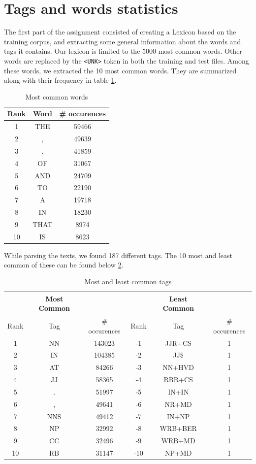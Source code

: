 \documentclass[10pt, a4paper, oneside]{article} %
\begin{document}
\section{Tags and words statistics}
The first part of the assignment consisted of creating a Lexicon based on the training corpus, and extracting some general information about the words and tags it contains. Our lexicon is limited to the 5000 most common words. Other words are replaced by the \texttt{<UNK>} token in both the training and test files. Among these words, we extracted the 10 most common words. They are summarized along with their frequency in table \ref{words}.
\begin{table}[!h]
\centering
\begin{tabular}{ | c | c | c | }
\hline
Rank & Word & \# occurences \\ \hline
1 & THE & 59466 \\
2 & , & 49639 \\
3 & . & 41859 \\
4 & OF & 31067 \\
5 & AND & 24709 \\
6 & TO & 22190 \\
7 & A & 19718 \\
8 & IN & 18230 \\
9 & THAT & 8974 \\
10 & IS &8623 \\ \hline
\end{tabular}
\caption{Most common words}
\label{words}
\end{table}

While parsing the texts, we found 187 different tags. The 10 most and least common of these can be found below \ref{tags}.
\begin{table}[!h]
\centering
\begin{tabular}{ | c | c | c | | c | c | c | }
\hline
& Most Common & & & Least Common & \\ \hline
Rank & Tag & \# occurences  & Rank & Tag & \# occurences\\ \hline
1 & NN & 143023 & -1 & JJR+CS & 1\\
2 & IN & 104385 & -2 & JJ\$ & 1\\
3 & AT & 84266 & -3 & NN+HVD & 1\\
4 & JJ & 58365 & -4 & RBR+CS & 1\\
5 & . & 51997 & -5 & IN+IN & 1\\
6 & , & 49641 & -6 & NR+MD & 1\\
7 & NNS & 49412 & -7 & IN+NP & 1\\
8 & NP & 32992 & -8 & WRB+BER & 1\\
9 & CC & 32496 & -9 & WRB+MD & 1\\
10 & RB & 31147 & -10 & NP+MD & 1\\ \hline
\end{tabular}
\caption{Most and least common tags}
\label{tags}
\end{table}
\end{document}
